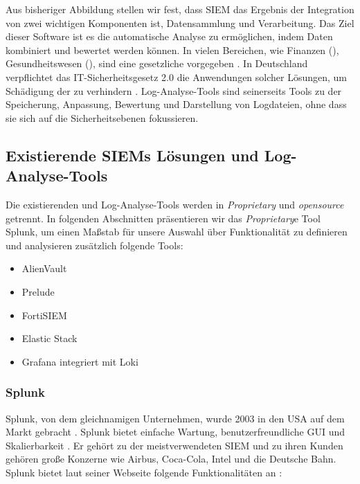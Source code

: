 Aus bisheriger Abbildung stellen wir fest, dass \gls{SIEM} das Ergebnis der Integration von zwei wichtigen Komponenten ist, Datensammlung und Verarbeitung. Das Ziel dieser Software ist es die automatische Analyse zu ermöglichen, indem Daten kombiniert und bewertet werden können. In vielen Bereichen, wie Finanzen (), Gesundheitswesen (), sind  eine gesetzliche vorgegeben \citep{Jog_SIEM}. In Deutschland verpflichtet das \gls{IT-Sicherheitsgesetz 2.0} die Anwendungen solcher Lösungen, um Schädigung der  zu verhindern \citep{BSI_ITSG}. Log-Analyse-Tools sind seinerseits Tools zu der Speicherung, Anpassung, Bewertung und Darstellung von Logdateien, ohne dass sie sich auf die Sicherheitsebenen fokussieren.

\subsection{Existierende SIEMs Lösungen und Log-Analyse-Tools}
Die existierenden  und Log-Analyse-Tools werden in \textit{\gls{Proprietary}} und \textit{\gls{opensource}} getrennt. In folgenden Abschnitten präsentieren wir das \textit{\gls{Proprietary}}e Tool Splunk, um einen Maßstab für unsere Auswahl über Funktionalität zu definieren und analysieren zusätzlich  folgende Tools: %

\begin{itemize}[noitemsep]
   \item AlienVault  %
   \item Prelude %
   \item FortiSIEM %
   \item Elastic Stack %
   \item Grafana integriert mit Loki %
\end{itemize}

\subsubsection{Splunk}
Splunk, von dem gleichnamigen Unternehmen, wurde 2003 in den USA auf dem Markt gebracht \citep{Splunk_splunk}. Splunk bietet einfache Wartung, benutzerfreundliche \gls{GUI} und Skalierbarkeit \citep{Kazarov_Splunk}. Er gehört zu der meistverwendeten \gls{SIEM} und zu ihren Kunden gehören große Konzerne wie Airbus, Coca-Cola, Intel und die Deutsche Bahn. Splunk bietet laut seiner Webseite folgende Funktionalitäten an \citep{Splunk_SPE}:

